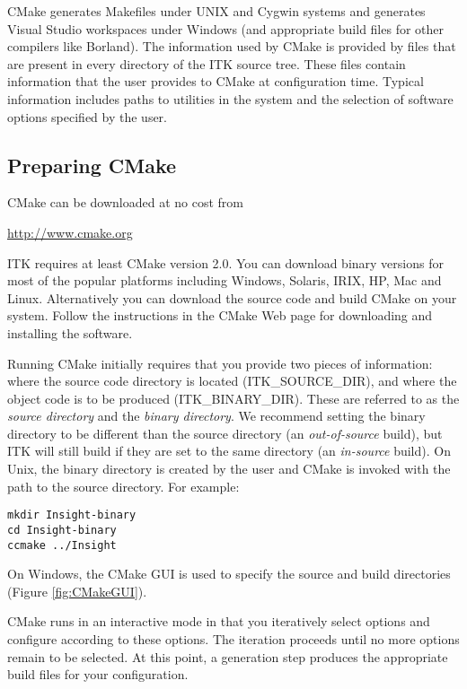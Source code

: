 CMake generates Makefiles under UNIX and Cygwin systems and generates Visual
Studio workspaces under Windows (and appropriate build files for other
compilers like Borland). The information used by CMake is provided by
 files that are present in every directory of the ITK
source tree. These files contain information that the user
provides to CMake at configuration time. Typical information includes paths
to utilities in the system and the selection of software options specified by
the user.

\subsection{Preparing CMake}
\label{sec:CMakeforITK}
 

CMake can be downloaded at no cost from 
\begin{center} 
  \url{http://www.cmake.org}
\end{center}

ITK requires at least CMake version 2.0. You can download binary
versions for most of the popular platforms including Windows, Solaris,
IRIX, HP, Mac and Linux. Alternatively you can download the source
code and build CMake on your system. Follow the instructions in the
CMake Web page for downloading and installing the software.

Running CMake initially requires that you provide two pieces of
information: where the source code directory is located
(ITK\_SOURCE\_DIR), and where the object code is to be produced
(ITK\_BINARY\_DIR). These are referred to as the \emph{source
directory} and the \emph{binary directory}. We recommend setting the
binary directory to be different than the source directory (an
\emph{out-of-source} build), but ITK will still build if they are set
to the same directory (an \emph{in-source} build).  On Unix, the
binary directory is created by the user and CMake is invoked with the
path to the source directory. For example:

\small
\begin{verbatim}
mkdir Insight-binary
cd Insight-binary
ccmake ../Insight
\end{verbatim}
\normalsize

On Windows, the CMake GUI is used to specify the source and build
directories (Figure \ref{fig:CMakeGUI}).

CMake runs in an interactive mode in that you iteratively select options and
configure according to these options. The iteration proceeds until no more
options remain to be selected. At this point, a generation step produces the appropriate
build files for your configuration.

